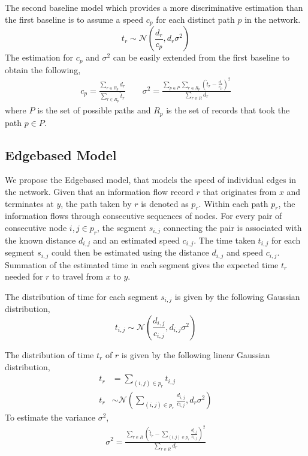 \documentclass{sig-alternate}
\begin{document}
The second baseline model which provides a more discriminative estimation than the first baseline is to assume a speed $c_p$ for each distinct path $p$ in the network.
\[ t_r \sim \mathcal{N} \left( \frac{d_r}{c_p}, d_r \sigma^2 \right) \]
The estimation for $c_p$ and $\sigma^2$ can be easily extended from the first baseline to obtain the following,
\begin{gather*}
	c_p = \frac{\sum_{r \in R_p} d_r}{\sum_{r \in R_p} \hat{t}_r} \qquad
    \sigma^2 = \frac{ \sum_{p \in P} \sum_{r \in R_p} \left( \hat{t}_r - \frac{d_r}{c_p} \right)^2 }{ \sum_{r \in R} d_r }
\end{gather*}
where $P$ is the set of possible paths and $R_p$ is the set of records that took the path $p \in P$.

\subsection{Edgebased Model}

We propose the Edgebased model, that models the speed of individual edges in the network. Given that an information flow record $r$ that originates from $x$ and terminates at $y$, the path taken by $r$ is denoted as $p_r$. Within each path $p_r$, the information flows through consecutive sequences of nodes. For every pair of consecutive node $i,j \in p_r$, the segment $s_{i,j}$ connecting the pair is associated with the known distance $d_{i,j}$ and an estimated speed $c_{i,j}$. The time taken $t_{i,j}$ for each segment $s_{i,j}$ could then be estimated using the distance $d_{i,j}$ and speed $c_{i,j}$. Summation of the estimated time in each segment gives the expected time $t_r$ needed for $r$ to travel from $x$ to $y$.

The distribution of time for each segment $s_{i,j}$ is given by the following Gaussian distribution,
\[ t_{i,j} \sim \mathcal{N} \left( \frac{d_{i,j}}{c_{i,j}}, d_{i,j} \sigma^2 \right) \]

The distribution of time $t_r$ of $r$ is given by the following linear Gaussian distribution,
\begin{align*}
	t_r &= \sum_{ (i,j) \in p_r } t_{i,j} \\
	t_r &\sim \mathcal{N} \left( \sum_{ (i,j) \in p_r } \frac{ d_{i,j} }{ c_{i,j} }, d_r \sigma^2 \right)
\end{align*}
To estimate the variance $\sigma^2$,
\begin{align*}
	\sigma^2 = \frac{ \sum_{r \in R} \left( \hat{t}_r - \sum_{ (i,j) \in p_r } \frac{d_{i,j}}{c_{i,j}} \right)^2}{\sum_{r \in R} d_r}
\end{align*}
\end{document}
